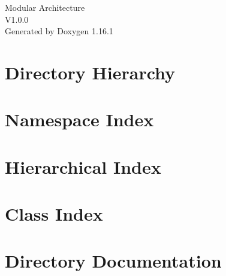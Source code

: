 \documentclass[twoside]{book}
\newcommand{\+}{\discretionary{\mbox{\scriptsize$\hookleftarrow$}}{}{}}
\newcommand{\clearemptydoublepage}{%
    \newpage{\pagestyle{empty}\cleardoublepage}%
  }
\begin{document}
  \raggedbottom
    \hypersetup{pageanchor=false,
                bookmarksnumbered=true,
                pdfencoding=unicode
               }
  \begin{titlepage}
  \vspace*{7cm}
  \begin{center}%
  {\Large Modular Architecture}\\
  [1ex]\large V1.\+0.\+0 \\
  \vspace*{1cm}
  {\large Generated by Doxygen 1.16.1}\\
  \end{center}
  \end{titlepage}
  \clearemptydoublepage
  \tableofcontents
  \clearemptydoublepage
  \hypersetup{pageanchor=true}





\chapter{Directory Hierarchy}

\chapter{Namespace Index}

\chapter{Hierarchical Index}

\chapter{Class Index}

\chapter{Directory Documentation}













\end{document}

